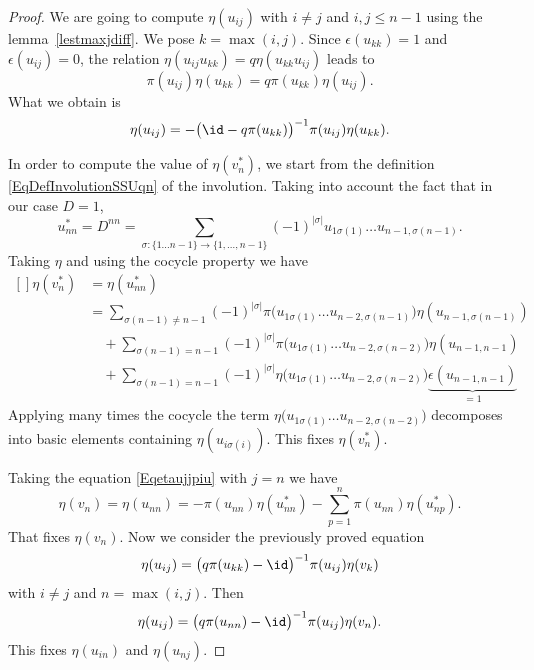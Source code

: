 \begin{proof}
	We are going to compute $\eta(u_{ij})$ with $i\neq j$ and $i,j\leq n-1$ using the lemma~\ref{lestmaxjdiff}. We pose $k=\max(i,j)$. Since $\epsilon(u_{kk})=1$ and $\epsilon(u_{ij})=0$, the relation $\eta(u_{ij}u_{kk})=q\eta(u_{kk}u_{ij})$ leads to
	\begin{equation}
		\pi(u_{ij})\eta(u_{kk})=q\pi(u_{kk})\eta(u_{ij}).
	\end{equation}
	What we obtain is
	\begin{equation}
		\eta(u_{ij})=-\big( \id-q\pi(u_{kk}) \big)^{-1}\pi(u_{ij})\eta(u_{kk}).
	\end{equation}

	In order to compute the value of $\eta(v_n^*)$, we start from the definition \eqref{EqDefInvolutionSSUqn} of the involution. Taking into account the fact that in our case $D=1$,
	\begin{equation}
		u_{nn}^*=D^{nn}=\sum_{\sigma\colon \{ 1\ldots n-1 \}\to \{ 1,\ldots,n-1 \}}(-1)^{| \sigma |}u_{1\sigma(1)}\ldots u_{n-1,\sigma(n-1)}.
	\end{equation}
	Taking $\eta$ and using the cocycle property we have
	\begin{equation}
		\begin{aligned}[]
			\eta(v_n^*) & =\eta(u_{nn}^*)                                                                                                                              \\
			            & =\sum_{\sigma(n-1)\neq n-1}(-1)^{| \sigma |}\pi\big( u_{1\sigma(1)}\ldots u_{n-2,\sigma(n-1)} \big)\eta(u_{n-1,\sigma(n-1)})                 \\
			            & \quad+\sum_{\sigma(n-1)=n-1}(-1)^{| \sigma |}\pi\big( u_{1\sigma(1)}\ldots u_{n-2,\sigma(n-2)} \big)\eta(u_{n-1,n-1})                        \\
			            & \quad+\sum_{\sigma(n-1)=n-1}(-1)^{| \sigma |}\eta\big( u_{1\sigma(1)}\ldots u_{n-2,\sigma(n-2)} \big)\underbrace{\epsilon(u_{n-1,n-1})}_{=1}
		\end{aligned}
	\end{equation}
	Applying many times the cocycle the term $\eta\big( u_{1\sigma(1)}\ldots u_{n-2,\sigma(n-2)} \big)$ decomposes into basic elements containing $\eta(u_{i\sigma(i)})$. This fixes $\eta(v_n^*)$.

	Taking the equation \eqref{Eqetaujjpiu} with $j=n$ we have
	\begin{equation}
		\eta(v_n)=\eta(u_{nn})=-\pi(u_{nn})\eta(u_{nn}^*)-\sum_{p=1}^n\pi(u_{nn})\eta(u_{np}^*).
	\end{equation}
	That fixes $\eta(v_n)$. Now we consider the previously proved equation
	\begin{equation}
		\eta(u_{ij})=\big( q\pi(u_{kk})-\id \big)^{-1}\pi(u_{ij})\eta(v_k)
	\end{equation}
	with $i\neq j$ and $n=\max(i,j)$. Then
	\begin{equation}
		\eta(u_{ij})=\big( q\pi(u_{nn})-\id \big)^{-1}\pi(u_{ij})\eta(v_n).
	\end{equation}
	This fixes $\eta(u_{in})$ and $\eta(u_{nj})$.

\end{proof}


